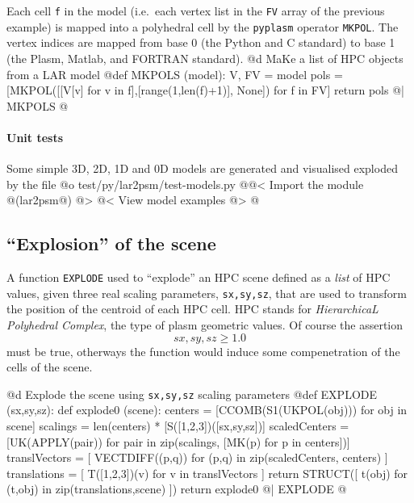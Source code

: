 \documentclass[11pt,oneside]{article}	%
\begin{document}
Each cell \texttt{f} in the model (i.e.~each vertex list in the \texttt{FV} array of the previous example) is mapped into a polyhedral cell by the \texttt{pyplasm} operator \texttt{MKPOL}. The vertex indices are mapped from base 0 (the Python and C standard) to base 1 (the Plasm, Matlab, and FORTRAN standard).
@d MaKe a list of HPC objects from a LAR model
@{def MKPOLS (model):
    V, FV = model
    pols = [MKPOL([[V[v] for v in f],[range(1,len(f)+1)], None]) for f in FV]
    return pols  
@| MKPOLS @}

\paragraph{Unit tests}
Some simple 3D, 2D, 1D and 0D models are generated and visualised exploded by the file
@o test/py/lar2psm/test-models.py
@{@< Import the module @(lar2psm@) @>
@< View model examples @>
@}

\subsection{``Explosion'' of the scene}

A function \texttt{EXPLODE} used to ``explode'' an HPC scene defined as a \emph{list} of HPC values, given three real scaling parameters, \texttt{sx,sy,sz}, that are used to transform the position of the centroid of each HPC cell. HPC stands for \emph{HierarchicaL Polyhedral Complex}, the  type of plasm geometric values. Of course the assertion
\[
sx,sy,sz \geq 1.0
\]
must be true, otherways the function would induce some compenetration of the cells of the scene.

@d Explode the scene using \texttt{sx,sy,sz} scaling parameters
@{def EXPLODE (sx,sy,sz):
    def explode0 (scene):
        centers = [CCOMB(S1(UKPOL(obj))) for obj in scene]
        scalings = len(centers) * [S([1,2,3])([sx,sy,sz])]
        scaledCenters = [UK(APPLY(pair)) for pair in
                         zip(scalings, [MK(p) for p in centers])]
        translVectors = [ VECTDIFF((p,q)) for (p,q) in zip(scaledCenters, centers) ]
        translations = [ T([1,2,3])(v) for v in translVectors ]
        return STRUCT([ t(obj) for (t,obj) in zip(translations,scene) ])
    return explode0  
@| EXPLODE @}
\end{document}
